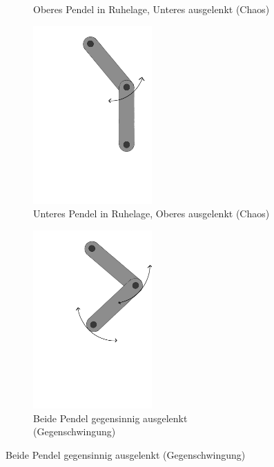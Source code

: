 \documentclass[11pt,a4paper,titlepage, ngerman]{article}
\begin{document}
\begin{figure}[ht]
\begin{subfigure}{0.5\textwidth}
					\caption{Oberes Pendel in Ruhelage, Unteres ausgelenkt (Chaos)}
					\label{abb:DP_RobenAunten}
				\end{subfigure}
				\begin{subfigure}{0.5\textwidth}
					\centering
					\includegraphics[width=0.5\textwidth]{Doppelpendel_Auslenkung_P1.png}
					\caption{Unteres Pendel in Ruhelage, Oberes ausgelenkt (Chaos)}
					\label{abb:DP_RuntenAoben}
				\end{subfigure}
				\begin{subfigure}{0.5\textwidth}
					\centering
					\includegraphics[width=0.5\textwidth]{Doppelpendel_Auslenkung_beide.png}
					\caption{Beide Pendel gegensinnig ausgelenkt (Gegenschwingung)}
					\label{abb:DP_ausgelenkt}

\end{subfigure}
\end{figure}
\end{document}
